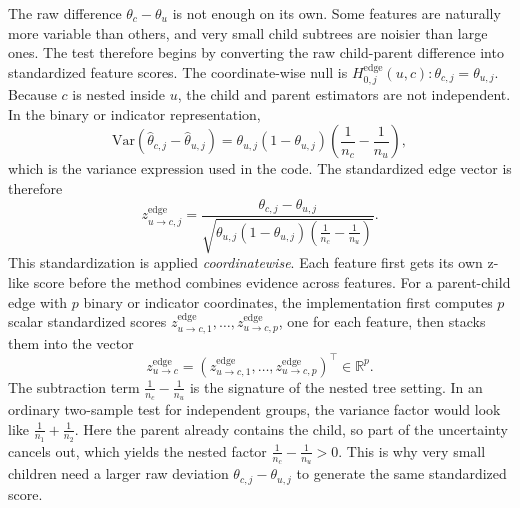 The raw difference $\theta_c-\theta_u$ is not enough on its own. Some features
are naturally more variable than others, and very small child subtrees are
noisier than large ones. The test therefore begins by converting the raw
child-parent difference into standardized feature scores. The coordinate-wise null is
$H_{0,j}^{\mathrm{edge}}(u,c): \theta_{c,j} = \theta_{u,j}$. Because $c$ is
nested inside $u$, the child and parent estimators are not independent. In the
binary or indicator representation,
\begin{equation}
\mathrm{Var}(\hat{\theta}_{c,j} - \hat{\theta}_{u,j})
=
\theta_{u,j}(1-\theta_{u,j})
\left(\frac{1}{n_c} - \frac{1}{n_u}\right),
\end{equation}
which is the variance expression used in the code. The standardized edge vector
is therefore
\begin{equation}
z_{u \to c,j}^{\mathrm{edge}}
=
\frac{\theta_{c,j} - \theta_{u,j}}
{\sqrt{\theta_{u,j}(1-\theta_{u,j})\left(\frac{1}{n_c} - \frac{1}{n_u}\right)}}.
\end{equation}
This standardization is applied \emph{coordinatewise}. Each feature first gets
its own z-like score before the method combines evidence across features. For a
parent-child edge with $p$ binary or indicator coordinates, the implementation first computes $p$ scalar standardized scores
$z_{u \to c,1}^{\mathrm{edge}},\dots,z_{u \to c,p}^{\mathrm{edge}}$, one for
each feature, then stacks them into the vector
\begin{equation}
z_{u \to c}^{\mathrm{edge}}
=
\left(
z_{u \to c,1}^{\mathrm{edge}},
\dots,
z_{u \to c,p}^{\mathrm{edge}}
\right)^\top
\in \mathbb{R}^p.
\end{equation}
The subtraction term
$\frac{1}{n_c} - \frac{1}{n_u}$ is the signature of the nested tree setting.
In an ordinary two-sample test for independent groups, the variance factor
would look like $\frac{1}{n_1} + \frac{1}{n_2}$. Here the parent already
contains the child, so part of the uncertainty cancels out, which yields the
nested factor $\frac{1}{n_c} - \frac{1}{n_u} > 0$. This is why very small
children need a larger raw deviation $\theta_{c,j} - \theta_{u,j}$ to generate
the same standardized score.

